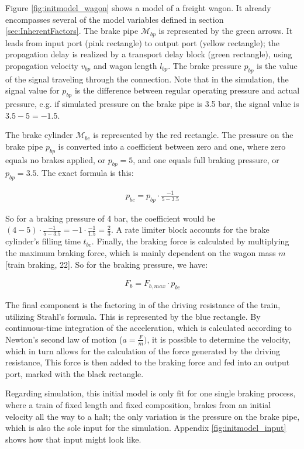 \par\noindent
Figure \ref{fig:initmodel_wagon} shows a model of a freight wagon. It already encompasses several of the model variables defined in section \ref{sec:InherentFactors}. The brake pipe ${\mathcal{M}}_{bp}$ is represented by the green arrows. It leads from input port (pink rectangle) to output port (yellow rectangle); the propagation delay is realized by a transport delay block (green rectangle), using propagation velocity $v_{bp}$ and wagon length $l_{bp}$. The brake pressure $p_{bp}$ is the value of the signal traveling through the connection. Note that in the simulation, the signal value for $p_{bp}$ is the difference between regular operating pressure and actual pressure, e.g. if simulated pressure on the brake pipe is 3.5 bar, the signal value is $3.5 - 5 = -1.5$.
\par
The brake cylinder ${\mathcal{M}}_{bc}$ is represented by the red rectangle. The pressure on the brake pipe $p_{bp}$ is converted into a coefficient between zero and one, where zero equals no brakes applied, or $p_{bp} = 5$, and one equals full braking pressure, or $p_{bp} = 3.5$. The exact formula is this:

\begin{align*}
p_{bc} = p_{bp} \cdot \frac{-1}{5-3.5}
\end{align*}

\noindent
So for a braking pressure of 4 bar, the coefficient would be $(4 - 5) \cdot \frac{-1}{5-3.5} = -1 \cdot \frac{-1}{1.5} = \frac{2}{3}$. A rate limiter block accounts for the brake cylinder's filling time $t_{bc}$. Finally, the braking force is calculated by multiplying the maximum braking force, which is mainly dependent on the wagon mass $m$ [train braking, 22]. So for the braking pressure, we have:

\begin{align*}
F_{b} = F_{b,max} \cdot p_{bc}
\end{align*}

\noindent
The final component is the factoring in of the driving resistance of the train, utilizing Strahl's formula. This is represented by the blue rectangle. By continuous-time integration of the acceleration, which is calculated according to Newton's second law of motion ($a = \frac{F}{m})$, it is possible to determine the velocity, which in turn allows for the calculation of the force generated by the driving resistance, This force is then added to the braking force and fed into an output port, marked with the black rectangle.
\par
Regarding simulation, this initial model is only fit for one single braking process, where a train of fixed length and fixed composition, brakes from an initial velocity all the way to a halt; the only variation is the pressure on the brake pipe, which is also the sole input for the simulation. Appendix \ref{fig:initmodel_input} shows how that input might look like.

